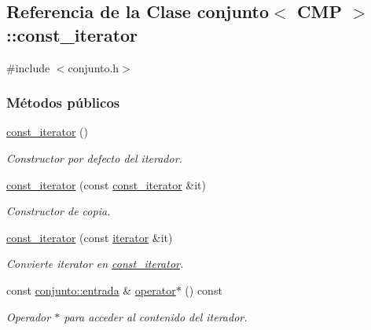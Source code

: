 \hypertarget{classconjunto_1_1const__iterator}{\subsection{Referencia de la Clase conjunto$<$ C\-M\-P $>$\-:\-:const\-\_\-iterator}
\label{classconjunto_1_1const__iterator}
}


{\ttfamily \#include $<$conjunto.\-h$>$}

\subsubsection*{Métodos públicos}
\begin{DoxyCompactItemize}
\item 
\hyperlink{classconjunto_1_1const__iterator_a7ef3baa2ab326f2f616816bb82e281e5}{const\-\_\-iterator} ()
\begin{DoxyCompactList}\small\item\em Constructor por defecto del iterador. \end{DoxyCompactList}\item 
\hyperlink{classconjunto_1_1const__iterator_ac945cf4d38b5131ea168957f557386e5}{const\-\_\-iterator} (const \hyperlink{classconjunto_1_1const__iterator}{const\-\_\-iterator} \&it)
\begin{DoxyCompactList}\small\item\em Constructor de copia. \end{DoxyCompactList}\item 
\hyperlink{classconjunto_1_1const__iterator_a5aca83d43f8232ef0604d4e6f84fd2be}{const\-\_\-iterator} (const \hyperlink{classconjunto_1_1iterator}{iterator} \&it)
\begin{DoxyCompactList}\small\item\em Convierte iterator en \hyperlink{classconjunto_1_1const__iterator}{const\-\_\-iterator}. \end{DoxyCompactList}\item 
const \hyperlink{classconjunto_a7630ace7cb17bcec07daf5804f1a0780}{conjunto\-::entrada} \& \hyperlink{classconjunto_1_1const__iterator_a9dd7a2ec0841720e5fe6f5441d0cf634}{operator$\ast$} () const 
\begin{DoxyCompactList}\small\item\em Operador $\ast$ para acceder al contenido del iterador. \end{DoxyCompactList}\item 

\end{DoxyCompactItemize}
